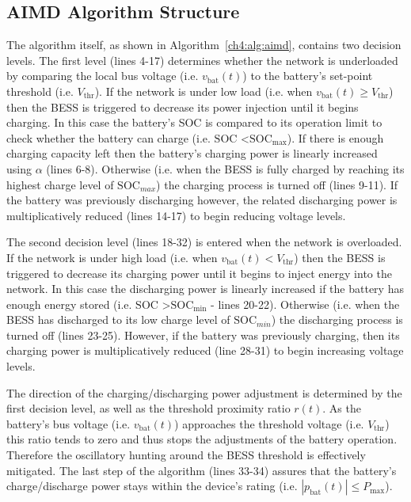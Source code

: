 \subsection{AIMD Algorithm Structure}

The algorithm itself, as shown in Algorithm~\ref{ch4:alg:aimd}, contains two decision levels.
The first level (lines 4-17) determines whether the network is underloaded by comparing the local bus voltage (i.e. $v_\text{bat}(t)$) to the battery's set-point threshold (i.e. $V_\text{thr}$).
If the network is under low load (i.e. when $v_\text{bat}(t) \geq V_\text{thr}$) then the BESS is triggered to decrease its power injection until it begins charging.
In this case the battery's SOC is compared to its operation limit to check whether the battery can charge (i.e. $\text{SOC}$ \textless $\text{SOC}_\text{max}$).
If there is enough charging capacity left then the battery's charging power is linearly increased using $\alpha$ (lines 6-8).
Otherwise (i.e. when the BESS is fully charged by reaching its highest charge level of $\text{SOC}_{max}$) the charging process is turned off (lines 9-11).
If the battery was previously discharging however, the related discharging power is multiplicatively reduced (lines 14-17) to begin reducing voltage levels.

The second decision level (lines 18-32) is entered when the network is overloaded.
If the network is under high load (i.e. when $v_\text{bat}(t) < V_\text{thr}$) then the BESS is triggered to decrease its charging power until it begins to inject energy into the network. 
In this case the discharging power is linearly increased if the battery has enough energy stored (i.e. $\text{SOC}$ \textgreater $\text{SOC}_\text{min}$ - lines 20-22).
Otherwise (i.e. when the BESS has discharged to its low charge level of $\text{SOC}_{min}$) the discharging process is turned off (lines 23-25).
However, if the battery was previously charging, then its charging power is multiplicatively reduced (line 28-31) to begin increasing voltage levels.

The direction of the charging/discharging power adjustment is determined by the first decision level, as well as the threshold proximity ratio $r(t)$.
As the battery's bus voltage (i.e. $v_\text{bat}(t)$) approaches the threshold voltage (i.e. $V_\text{thr}$) this ratio tends to zero and thus stops the adjustments of the battery operation.
Therefore the oscillatory hunting around the BESS threshold is effectively mitigated.
The last step of the algorithm (lines 33-34) assures that the battery's charge/discharge power stays within the device's rating (i.e. $|p_\text{bat}(t)| \leq P_\text{max}$).

